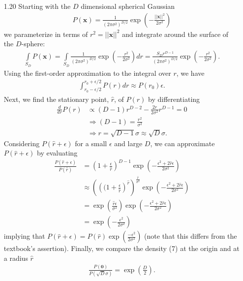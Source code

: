 \documentclass[]{article}
\begin{document}
\begin{enumerate}
 	\item[1.20] Starting with the $D$ dimensional spherical Gaussian
 	\begin{align*}
 	P(\mathbf{x}) = \frac{1}{(2 \pi \sigma^2)^{D/2}} \exp \left(- \frac{||\mathbf{x}||^2}{2 \sigma^2}\right) \tag{7}
 	\end{align*}
 	we parameterize in terms of $r^2 = ||\mathbf{x}||^2$ and integrate around the surface of the $D$-sphere:
 	\begin{align*}
 	\int\limits_{S_D} P(\mathbf{x}) = \int\limits_{S_D} \frac{1}{(2 \pi \sigma^2)^{D/2}} \exp \left(- \frac{r^2}{2 \sigma^2}\right) dr = \frac{S_Dr^{D-1}}{(2 \pi \sigma^2)^{D/2}} \exp \left(- \frac{r^2}{2 \sigma^2}\right).
 	\end{align*}
 	Using the first-order approximation to the integral over $r$, we have
 	\begin{align*}
 	\int_{r_0 - \epsilon/2}^{r_0 + \epsilon/2} P(r) dr \approx  P(r_0) \epsilon.
 	\end{align*} 
 	Next, we find the stationary point, $\hat{r}$, of $P(r)$ by differentiating
 	\begin{align*}
 	\frac{d}{dr}P(r) &\propto (D-1)r^{D-2} - \frac{2r}{2\sigma^2}r^{D-1} = 0 \\
 	& \Rightarrow (D-1) = \frac{r^2}{\sigma^2} \\
 	& \Rightarrow r = \sqrt{D-1} \sigma \approx \sqrt{D}\sigma.
 	\end{align*}
 	Considering $P(\hat{r} + \epsilon)$ for a small $\epsilon$ and large $D$, we can approximate $P(\hat{r} + \epsilon)$ by evaluating 
 	\begin{align*}
 	\frac{P(\hat{r} + \epsilon)}{P(\hat{r})} &= \left(1 + \frac{\epsilon}{\hat{r}}\right)^{D-1}\exp\left(-\frac{\epsilon^2+ 2\hat{r}\epsilon}{2\sigma^2}\right) \\
 	&\approx \left(\left((1 + \frac{\epsilon}{\hat{r}}\right)^{\hat{r}}\right)^\frac{\hat{r}}{\sigma^2}  \exp\left(-\frac{\epsilon^2+ 2\hat{r}\epsilon}{2\sigma^2}\right) \\
 	&= \exp\left( \frac{ \hat{r}\epsilon}{\sigma^2} \right) \exp\left( -\frac{\epsilon^2 + 2\hat{r} \epsilon}{2\sigma^2} \right) \\
 	&= \exp \left( -\frac{\epsilon^2}{2\sigma^2} \right)
 	\end{align*}
 	implying that $P(\hat{r} + \epsilon)=P(\hat{r})\exp\left(\frac{-\epsilon^2}{2\sigma^2}\right)$ (note that this differs from the textbook's assertion). Finally, we compare the density (7) at the origin and at a radius $\hat{r}$
 	\begin{align*}
 	\frac{P(\mathbf{0})}{P(\sqrt{D}\sigma)}=\exp \left( \frac{D}{2} \right).
 	\end{align*}
 	

\end{enumerate}
\end{document}
